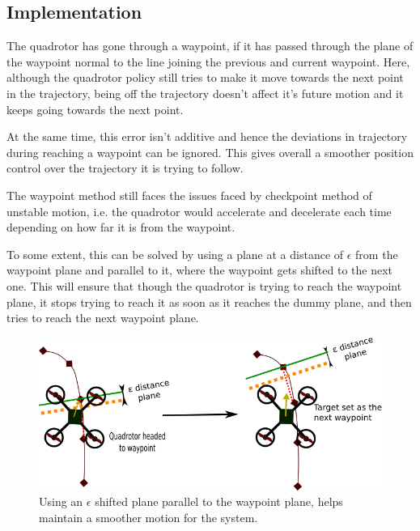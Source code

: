 \documentclass[hidelinks,BTech]{iitmdiss}
\begin{document}
\subsection{Implementation}
The quadrotor has gone through a waypoint, if it has passed through the plane of the waypoint normal to the line joining the previous and current waypoint. Here, although the quadrotor policy still tries to make it move towards the next point in the trajectory, being off the trajectory doesn't affect it's future motion and it keeps going towards the next point. 

At the same time, this error isn't additive and hence the deviations in trajectory during reaching a waypoint can be ignored. This gives overall a smoother position control over the trajectory it is trying to follow.

The waypoint method still faces the issues faced by checkpoint method of unstable motion, i.e. the quadrotor would accelerate and decelerate each time depending on how far it is from the waypoint.

To some extent, this can be solved by using a plane at a distance of $\epsilon$ from the waypoint plane and parallel to it, where the waypoint gets shifted to the next one. This will ensure that though the quadrotor is trying to reach the waypoint plane, it stops trying to reach it as soon as it reaches the dummy plane, and then tries to reach the next waypoint plane.
\begin{figure}[H]
  \centering
    \includegraphics[width=\textwidth]{Waypoints_epsilon.png}
    \caption{Using an $\epsilon$ shifted plane parallel to the waypoint plane, helps maintain a smoother motion for the system.}
\end{figure}
\end{document}
